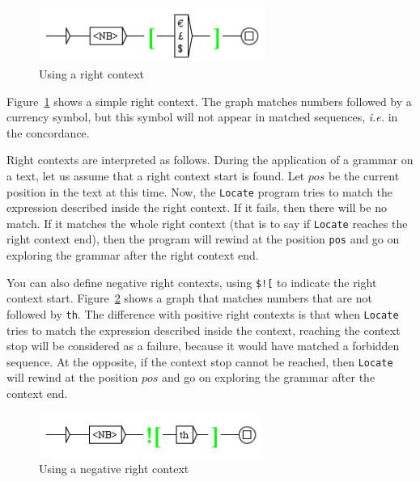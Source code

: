 \bigskip
\begin{figure}[!h]
\begin{center}
\includegraphics[width=7.4cm]{resources/img/fig6-12.png}
\caption{Using a right context\label{fig-context1}}
\end{center}
\end{figure}

\bigskip
\noindent Figure~\ref{fig-context1} shows a simple right context. The graph
matches numbers followed by a currency symbol, but this symbol will not appear in
matched sequences, \textit{i.e.} in the concordance.

\bigskip
\noindent Right contexts are interpreted as follows. During the application of a
grammar on a text, let us assume that a right context start is found. Let $pos$ be the
current position in the text at this time. Now, the \verb$Locate$ program tries to match
the expression described inside the right context. If it fails, then there will
be no match. If it matches the whole right context (that is to say if
\verb$Locate$ reaches the right context end), then the program will rewind at
the position \verb$pos$ and go on exploring the grammar after the right context
end.

\bigskip
\noindent You can also define negative right contexts,
using \verb+$![+ to indicate the right context start. Figure~\ref{fig-context2}
shows a graph that matches numbers that are not followed by \verb+th+. The difference
with positive right contexts is that when \verb$Locate$ tries to match the
expression described inside the context, reaching the context stop will be
considered as a failure, because it would have matched a forbidden sequence. At the opposite, if
the context stop cannot be reached, then \verb$Locate$ will rewind at the
position $pos$ and go on exploring the grammar after the context end.

\bigskip
\begin{figure}[!h]
\begin{center}
\includegraphics[width=7.3cm]{resources/img/fig6-13.png}
\caption{Using a negative right context\label{fig-context2}}
\end{center}
\end{figure}


